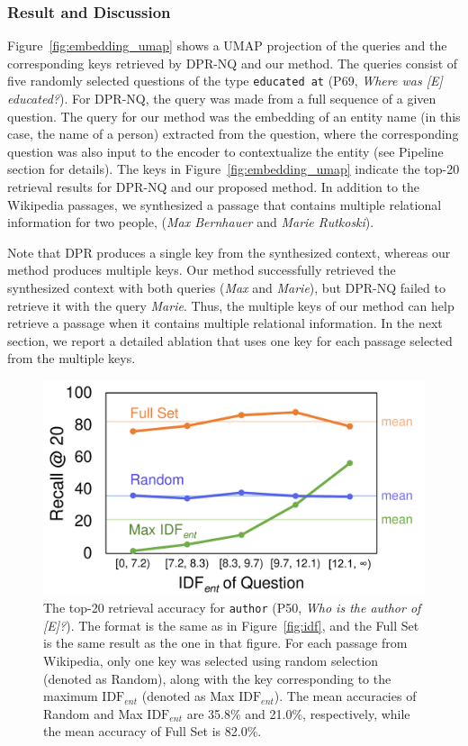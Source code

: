 \documentclass[letterpaper]{article} %
\begin{document}
\subsubsection{Result and Discussion}
Figure~\ref{fig:embedding_umap} shows a UMAP projection \citep{umap} of the queries and the corresponding keys retrieved by DPR-NQ and our method.
The queries consist of five randomly selected questions of the type \texttt{\small educated at} (P69, \textit{Where was [E] educated?}).
For DPR-NQ, the query was made from a full sequence of a given question.
The query for our method was the embedding of an entity name (in this case, the name of a person) extracted from the question, where the corresponding question was also input to the encoder to contextualize the entity (see Pipeline section for details).
The keys in Figure~\ref{fig:embedding_umap} indicate the top-20 retrieval results for DPR-NQ and our proposed method.
In addition to the Wikipedia passages, we synthesized a passage that contains multiple relational information for two people, (\textit{Max Bernhauer} and \textit{Marie Rutkoski}).

Note that DPR produces a single key from the synthesized context, whereas our method produces multiple keys.
Our method successfully retrieved the synthesized context with both queries (\textit{Max} and \textit{Marie}), but DPR-NQ failed to retrieve it with the query \textit{Marie}.
Thus, the multiple keys of our method can help retrieve a passage when it contains multiple relational information.
In the next section, we report a detailed ablation that uses one key for each passage selected from the multiple keys.


\begin{figure}
	\centering
	\includegraphics[width=\linewidth]{figures/idf_5_buckets_one_key.pdf}
	\caption{
		The top-20 retrieval accuracy for \texttt{\small author} (P50, \textit{Who is the author of [E]?}).
		The format is the same as in Figure~\ref{fig:idf},
		and the Full Set is the same result as the one in that figure.
		For each passage from Wikipedia, only one key was selected using random selection (denoted as Random), along with the key corresponding to the maximum $\mathrm{IDF}_{ent}$ (denoted as Max $\mathrm{IDF}_{ent}$).
		The mean accuracies of Random and Max $\mathrm{IDF}_{ent}$ are 35.8\% and 21.0\%, respectively, while the mean accuracy of Full Set is 82.0\%.
	}
	\label{fig:one_key}
\end{figure}
\end{document}
